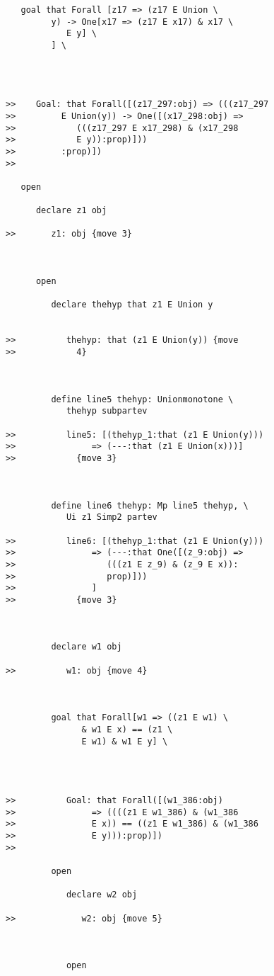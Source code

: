 \documentclass[12pt]{article}
\begin{document}
\begin{verbatim}
   goal that Forall [z17 => (z17 E Union \
         y) -> One[x17 => (z17 E x17) & x17 \
            E y] \
         ] \
      



>>    Goal: that Forall([(z17_297:obj) => (((z17_297
>>         E Union(y)) -> One([(x17_298:obj) =>
>>            (((z17_297 E x17_298) & (x17_298
>>            E y)):prop)]))
>>         :prop)])
>>      

   open

      declare z1 obj

>>       z1: obj {move 3}



      open

         declare thehyp that z1 E Union y


>>          thehyp: that (z1 E Union(y)) {move
>>            4}



         define line5 thehyp: Unionmonotone \
            thehyp subpartev

>>          line5: [(thehyp_1:that (z1 E Union(y)))
>>               => (---:that (z1 E Union(x)))]
>>            {move 3}



         define line6 thehyp: Mp line5 thehyp, \
            Ui z1 Simp2 partev

>>          line6: [(thehyp_1:that (z1 E Union(y)))
>>               => (---:that One([(z_9:obj) =>
>>                  (((z1 E z_9) & (z_9 E x)):
>>                  prop)]))
>>               ]
>>            {move 3}



         declare w1 obj

>>          w1: obj {move 4}



         goal that Forall[w1 => ((z1 E w1) \
               & w1 E x) == (z1 \
               E w1) & w1 E y] \
            



>>          Goal: that Forall([(w1_386:obj)
>>               => ((((z1 E w1_386) & (w1_386
>>               E x)) == ((z1 E w1_386) & (w1_386
>>               E y))):prop)])
>>            

         open

            declare w2 obj

>>             w2: obj {move 5}



            open


\end{verbatim}
\end{document}

